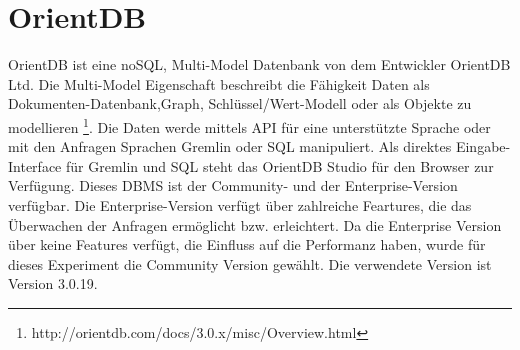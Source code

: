 \section{OrientDB}
OrientDB ist eine noSQL,  Multi-Model Datenbank von dem Entwickler OrientDB Ltd. Die Multi-Model Eigenschaft beschreibt die Fähigkeit Daten als Dokumenten-Datenbank,Graph, Schlüssel/Wert-Modell oder als Objekte zu modellieren \footnote{http://orientdb.com/docs/3.0.x/misc/Overview.html}. Die Daten werde mittels API für eine unterstützte Sprache oder mit den Anfragen Sprachen Gremlin oder SQL manipuliert. Als direktes Eingabe-Interface für Gremlin und SQL steht das OrientDB Studio für den Browser zur Verfügung. Dieses DBMS ist der Community- und der Enterprise-Version verfügbar. Die Enterprise-Version verfügt über zahlreiche Feartures, die das Überwachen der Anfragen ermöglicht bzw. erleichtert. Da die Enterprise Version über keine Features verfügt, die Einfluss auf die  Performanz haben, wurde für dieses Experiment die Community Version gewählt. Die verwendete Version ist Version 3.0.19. 

